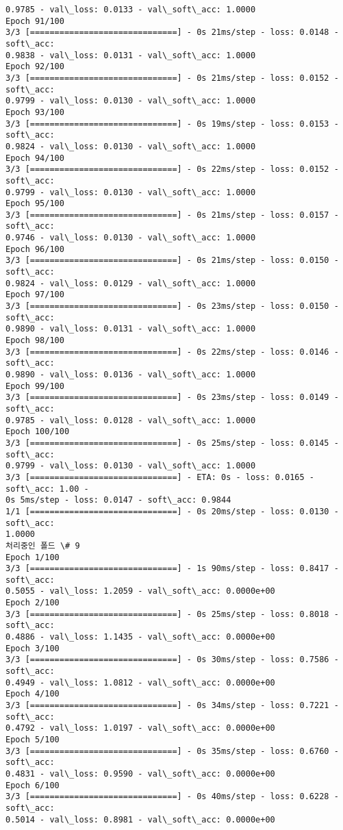 \documentclass[11pt]{article}
\begin{document}
\begin{Verbatim}[commandchars=\\\{\}]
0.9785 - val\_loss: 0.0133 - val\_soft\_acc: 1.0000
Epoch 91/100
3/3 [==============================] - 0s 21ms/step - loss: 0.0148 - soft\_acc:
0.9838 - val\_loss: 0.0131 - val\_soft\_acc: 1.0000
Epoch 92/100
3/3 [==============================] - 0s 21ms/step - loss: 0.0152 - soft\_acc:
0.9799 - val\_loss: 0.0130 - val\_soft\_acc: 1.0000
Epoch 93/100
3/3 [==============================] - 0s 19ms/step - loss: 0.0153 - soft\_acc:
0.9824 - val\_loss: 0.0130 - val\_soft\_acc: 1.0000
Epoch 94/100
3/3 [==============================] - 0s 22ms/step - loss: 0.0152 - soft\_acc:
0.9799 - val\_loss: 0.0130 - val\_soft\_acc: 1.0000
Epoch 95/100
3/3 [==============================] - 0s 21ms/step - loss: 0.0157 - soft\_acc:
0.9746 - val\_loss: 0.0130 - val\_soft\_acc: 1.0000
Epoch 96/100
3/3 [==============================] - 0s 21ms/step - loss: 0.0150 - soft\_acc:
0.9824 - val\_loss: 0.0129 - val\_soft\_acc: 1.0000
Epoch 97/100
3/3 [==============================] - 0s 23ms/step - loss: 0.0150 - soft\_acc:
0.9890 - val\_loss: 0.0131 - val\_soft\_acc: 1.0000
Epoch 98/100
3/3 [==============================] - 0s 22ms/step - loss: 0.0146 - soft\_acc:
0.9890 - val\_loss: 0.0136 - val\_soft\_acc: 1.0000
Epoch 99/100
3/3 [==============================] - 0s 23ms/step - loss: 0.0149 - soft\_acc:
0.9785 - val\_loss: 0.0128 - val\_soft\_acc: 1.0000
Epoch 100/100
3/3 [==============================] - 0s 25ms/step - loss: 0.0145 - soft\_acc:
0.9799 - val\_loss: 0.0130 - val\_soft\_acc: 1.0000
3/3 [==============================] - ETA: 0s - loss: 0.0165 - soft\_acc: 1.00 -
0s 5ms/step - loss: 0.0147 - soft\_acc: 0.9844
1/1 [==============================] - 0s 20ms/step - loss: 0.0130 - soft\_acc:
1.0000
처리중인 폴드 \# 9
Epoch 1/100
3/3 [==============================] - 1s 90ms/step - loss: 0.8417 - soft\_acc:
0.5055 - val\_loss: 1.2059 - val\_soft\_acc: 0.0000e+00
Epoch 2/100
3/3 [==============================] - 0s 25ms/step - loss: 0.8018 - soft\_acc:
0.4886 - val\_loss: 1.1435 - val\_soft\_acc: 0.0000e+00
Epoch 3/100
3/3 [==============================] - 0s 30ms/step - loss: 0.7586 - soft\_acc:
0.4949 - val\_loss: 1.0812 - val\_soft\_acc: 0.0000e+00
Epoch 4/100
3/3 [==============================] - 0s 34ms/step - loss: 0.7221 - soft\_acc:
0.4792 - val\_loss: 1.0197 - val\_soft\_acc: 0.0000e+00
Epoch 5/100
3/3 [==============================] - 0s 35ms/step - loss: 0.6760 - soft\_acc:
0.4831 - val\_loss: 0.9590 - val\_soft\_acc: 0.0000e+00
Epoch 6/100
3/3 [==============================] - 0s 40ms/step - loss: 0.6228 - soft\_acc:
0.5014 - val\_loss: 0.8981 - val\_soft\_acc: 0.0000e+00

\end{Verbatim}
\end{document}
